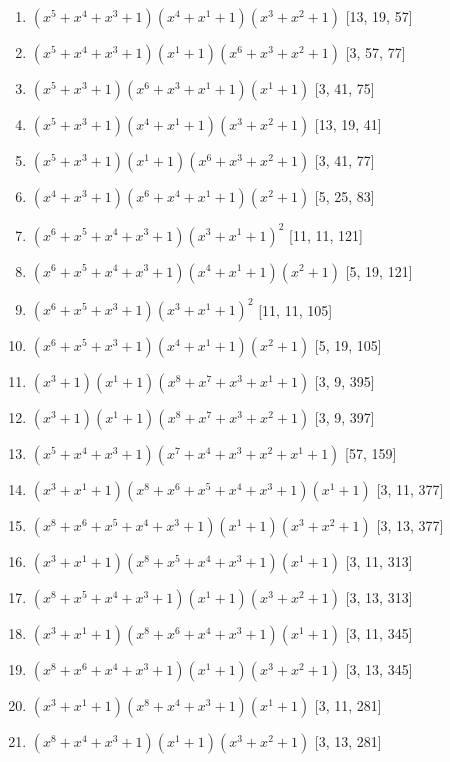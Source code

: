 \documentclass[10pt,twocolumn]{article}
\begin{document}
\begin{enumerate}
\item $(x^{5} + x^{4} + x^{3} + 1)(x^{4} + x^{1} + 1)(x^{3} + x^{2} + 1)$  [13, 19, 57]
\item $(x^{5} + x^{4} + x^{3} + 1)(x^{1} + 1)(x^{6} + x^{3} + x^{2} + 1)$  [3, 57, 77]
\item $(x^{5} + x^{3} + 1)(x^{6} + x^{3} + x^{1} + 1)(x^{1} + 1)$  [3, 41, 75]
\item $(x^{5} + x^{3} + 1)(x^{4} + x^{1} + 1)(x^{3} + x^{2} + 1)$  [13, 19, 41]
\item $(x^{5} + x^{3} + 1)(x^{1} + 1)(x^{6} + x^{3} + x^{2} + 1)$  [3, 41, 77]
\item $(x^{4} + x^{3} + 1)(x^{6} + x^{4} + x^{1} + 1)(x^{2} + 1)$  [5, 25, 83]
\item $(x^{6} + x^{5} + x^{4} + x^{3} + 1)(x^{3} + x^{1} + 1)^{2}$  [11, 11, 121]
\item $(x^{6} + x^{5} + x^{4} + x^{3} + 1)(x^{4} + x^{1} + 1)(x^{2} + 1)$  [5, 19, 121]
\item $(x^{6} + x^{5} + x^{3} + 1)(x^{3} + x^{1} + 1)^{2}$  [11, 11, 105]
\item $(x^{6} + x^{5} + x^{3} + 1)(x^{4} + x^{1} + 1)(x^{2} + 1)$  [5, 19, 105]
\item $(x^{3} + 1)(x^{1} + 1)(x^{8} + x^{7} + x^{3} + x^{1} + 1)$  [3, 9, 395]
\item $(x^{3} + 1)(x^{1} + 1)(x^{8} + x^{7} + x^{3} + x^{2} + 1)$  [3, 9, 397]
\item $(x^{5} + x^{4} + x^{3} + 1)(x^{7} + x^{4} + x^{3} + x^{2} + x^{1} + 1)$  [57, 159]
\item $(x^{3} + x^{1} + 1)(x^{8} + x^{6} + x^{5} + x^{4} + x^{3} + 1)(x^{1} + 1)$  [3, 11, 377]
\item $(x^{8} + x^{6} + x^{5} + x^{4} + x^{3} + 1)(x^{1} + 1)(x^{3} + x^{2} + 1)$  [3, 13, 377]
\item $(x^{3} + x^{1} + 1)(x^{8} + x^{5} + x^{4} + x^{3} + 1)(x^{1} + 1)$  [3, 11, 313]
\item $(x^{8} + x^{5} + x^{4} + x^{3} + 1)(x^{1} + 1)(x^{3} + x^{2} + 1)$  [3, 13, 313]
\item $(x^{3} + x^{1} + 1)(x^{8} + x^{6} + x^{4} + x^{3} + 1)(x^{1} + 1)$  [3, 11, 345]
\item $(x^{8} + x^{6} + x^{4} + x^{3} + 1)(x^{1} + 1)(x^{3} + x^{2} + 1)$  [3, 13, 345]
\item $(x^{3} + x^{1} + 1)(x^{8} + x^{4} + x^{3} + 1)(x^{1} + 1)$  [3, 11, 281]
\item $(x^{8} + x^{4} + x^{3} + 1)(x^{1} + 1)(x^{3} + x^{2} + 1)$  [3, 13, 281]

\end{enumerate}
\end{document}
